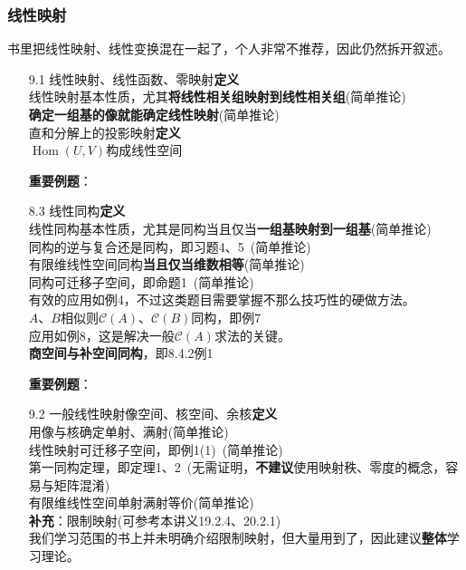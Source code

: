\documentclass[a4paper,UTF8,fontset=windows,AutoFakeBold]{ctexart}
\DeclareMathOperator{\Hom}{Hom}
\newcommand*{\mc}{\mathcal{C}}
\newcommand*{\note}{\noindent *}
\begin{document}
\subsubsection{线性映射}
书里把线性映射、线性变换混在一起了，个人非常不推荐，因此仍然拆开叙述。
\begin{enumerate}
    \item[9.1]  线性映射、线性函数、零映射\textbf{定义}
    \\线性映射基本性质，尤其\textbf{将线性相关组映射到线性相关组}(简单推论)
    \\\textbf{确定一组基的像就能确定线性映射}(简单推论)
    \\直和分解上的投影映射\textbf{定义}
    \\$\Hom(U,V)$构成线性空间

    \textbf{重要例题}：

    \item[8.3] 线性同构\textbf{定义}
    \\线性同构基本性质，尤其是同构当且仅当\textbf{一组基映射到一组基}(简单推论)
    \\同构的逆与复合还是同构，即习题4、5\ (简单推论)
    \\有限维线性空间同构\textbf{当且仅当维数相等}(简单推论)
    \\同构可迁移子空间，即命题1\ (简单推论)
    \\\note 有效的应用如例4，不过这类题目需要掌握不那么技巧性的硬做方法。
    \\$A$、$B$相似则$\mc(A)$、$\mc(B)$同构，即例7
    \\\note 应用如例8，这是解决一般$\mc(A)$求法的关键。
    \\\textbf{商空间与补空间同构}，即8.4.2例1
    
    \textbf{重要例题}：

    \item[9.2] 一般线性映射像空间、核空间、余核\textbf{定义}
    \\用像与核确定单射、满射(简单推论)
    \\线性映射可迁移子空间，即例1(1)\ (简单推论)
    \\第一同构定理，即定理1、2\ (无需证明，\textbf{不建议}使用映射秩、零度的概念，容易与矩阵混淆)
    \\有限维线性空间单射满射等价(简单推论)
    \\\textbf{补充}：限制映射(可参考本讲义19.2.4、20.2.1)
    \\\note 我们学习范围的书上并未明确介绍限制映射，但大量用到了，因此建议\textbf{整体}学习理论。
    

\end{enumerate}
\end{document}
